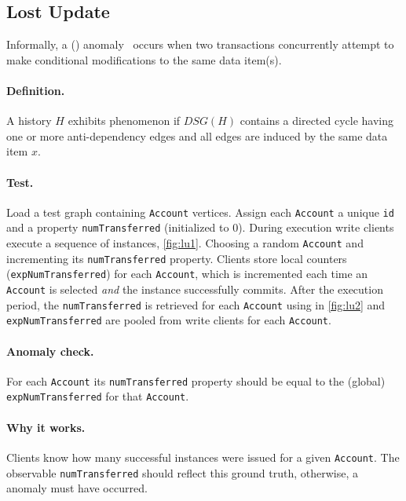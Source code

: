 \subsection{Lost Update}
\label{sec:lost-update}

Informally, a  ()
anomaly~\cite{DBLP:journals/tods/BailisFGHS16} occurs when two transactions
concurrently attempt to make conditional modifications to the same data item(s).

\paragraph{Definition.}
A history $H$ exhibits phenomenon  if $\textit{DSG}(H)$ contains a
directed cycle having one or more anti-dependency edges and all edges are induced
by the same data item $x$.

\paragraph{Test.}
Load a test graph containing \texttt{Account} vertices. Assign each \texttt{Account}
a unique \texttt{id} and a property \texttt{numTransferred} (initialized to 0).
During execution write clients execute a sequence of 
instances, \autoref{fig:lu1}. Choosing a random \texttt{Account} and incrementing
its \texttt{numTransferred} property. Clients store local counters
(\texttt{expNumTransferred}) for each \texttt{Account}, which is incremented
each time an \texttt{Account} is selected \emph{and} the 
instance successfully commits. After the execution period, the
\texttt{numTransferred} is retrieved for each \texttt{Account} using
 in \autoref{fig:lu2} and \texttt{expNumTransferred} are
pooled from write clients for each \texttt{Account}.

\paragraph{Anomaly check.}
For each \texttt{Account} its \texttt{numTransferred} property should be equal
to the (global) \texttt{expNumTransferred} for that \texttt{Account}.

\paragraph{Why it works.}
Clients know how many successful  instances were issued
for a given \texttt{Account}. The observable \texttt{numTransferred} should
reflect this ground truth, otherwise, a  anomaly must have occurred.


